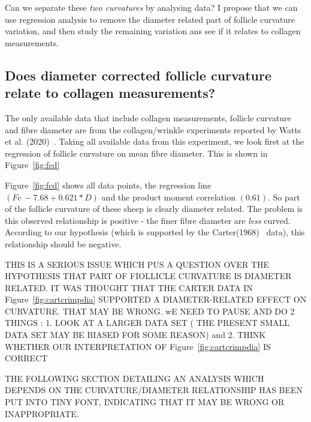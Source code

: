 \documentclass{article}
\begin{document}
Can we separate these {\em two curvatures} by analysing data?  I propose that we can use regression analysis to remove the diameter related part of follicle curvature variation, and then study the remaining variation ans see if it relates to collagen measurements.

\subsection{ Does diameter corrected follicle curvature relate to collagen measurements?}
The only available data that include collagen measurements, follicle curvature and fibre diameter are  from the collagen/wrinkle experiments reported by Watts et al. (2020)~\cite{watts-2020}. Taking all available data from this experiment, we look first at the regression of follicle curvature on mean fibre diameter. This is shown in Figure~\ref{fig:fcd}

Figure~\ref{fig:fcd} shows all data points, the regression line $(Fc ~  -7.68   + 0.621 * D)$ and the product moment correlation $(0.61)$. So part of the follicle curvature of these sheep is clearly diameter related.  The problem is this observed relationship is positive - the finer fibre diameter are {\em less} curved. According to our hypothesis (which is supported by the Carter(1968)~\cite{carter-1968} data), this relationship should be negative. 

THIS IS A SERIOUS ISSUE WHICH PUS A QUESTION OVER THE HYPOTHESIS THAT PART OF FIOLLICLE CURVATURE IS DIAMETER RELATED. IT WAS THOUGHT THAT THE CARTER DATA IN Figure~\ref{fig:cartcrimpdia} SUPPORTED A DIAMETER-RELATED EFFECT ON CURVATURE. THAT MAY BE WRONG. wE NEED TO PAUSE AND DO 2 THINGS : 1. LOOK AT A LARGER DATA SET ( THE PRESENT SMALL DATA SET MAY BE BIASED FOR SOME REASON) and 2. THINK WHETHER OUR INTERPRETATION OF  Figure~\ref{fig:cartcrimpdia} IS CORRECT

THE FOLLOWING SECTION DETAILING AN ANALYSIS WHICH DEPENDS ON THE CURVATURE/DIAMETER RELATIONSHIP HAS BEEN PUT INTO TINY FONT, INDICATING THAT IT MAY BE WRONG OR INAPPROPRIATE. 
\end{document}
